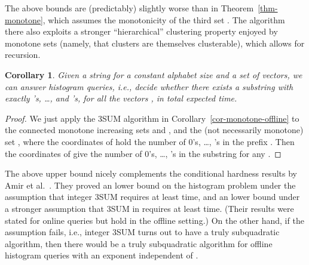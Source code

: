 \documentclass[11pt]{article}
\newcommand{\LONG}[1]{#1}\newcommand{\SHORT}[1]{}
\newtheorem{corollary}[theorem]{Corollary}
\begin{document}
The above bounds are (predictably) slightly worse than in
Theorem~\ref{thm-monotone}, which assumes
the monotonicity of the third set .  The algorithm there also
exploits a stronger ``hierarchical'' clustering property enjoyed by
monotone sets (namely, that clusters are themselves clusterable),
which allows for recursion.


\begin{corollary}\label{cor-jumble-offline}
Given a string  for a constant
alphabet size  and a set  of  vectors,
we can answer histogram queries, i.e.,
decide whether there exists a substring with
exactly  's, \ldots, and  's,
for all the vectors ,
in  total expected time.
\end{corollary}
\begin{proof}
We just apply the 3SUM algorithm in Corollary~\ref{cor-monotone-offline} to the
\LONG{connected }monotone increasing sets  and
, and the (not necessarily monotone) set ,
where the  coordinates of  hold the number of 0's, \ldots, 's
in the prefix .
Then the  coordinates of  give
the number of 0's, \ldots, 's in the substring  for any .
\end{proof}

The above upper bound nicely complements
the conditional hardness results by
Amir et al.~\cite{ACLL14}.  They proved an  lower
bound on the histogram problem under the assumption that integer 3SUM requires at least  time, and an 
lower bound under a stronger assumption that
3SUM in  requires at least  time.  (Their results
were stated for online queries but hold in the offline
setting.)  On the other hand, if the assumption fails, i.e.,
integer 3SUM turns out to have a truly subquadratic algorithm,
then there would be a truly subquadratic algorithm
for offline histogram queries with an exponent independent of .
\end{document}
